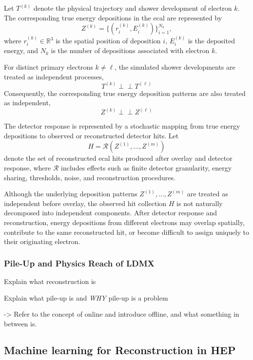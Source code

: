 Let \(T^{(k)}\) denote the physical trajectory and shower development of electron \(k\). 
The corresponding true energy depositions in the \gls{ecal} are represented by
\[
Z^{(k)} = \{(r^{(k)}_i, E^{(k)}_i)\}_{i=1}^{N_k},
\]
where \(r^{(k)}_i \in \mathbb{R}^3\) is the spatial position of deposition \(i\), 
\(E^{(k)}_i\) is the deposited energy, and \(N_k\) is the number of depositions associated with electron \(k\).

For distinct primary electrons \(k \neq \ell\), the simulated shower developments are treated as independent processes,
\[
T^{(k)} \perp\!\!\!\perp T^{(\ell)}
\]
Consequently, the corresponding true energy deposition patterns are also treated as independent,
\[
Z^{(k)} \perp\!\!\!\perp Z^{(\ell)}
\]

The detector response is represented by a stochastic mapping from true energy depositions to observed or reconstructed detector hits. 
Let
\[
H = \mathcal{R}\!\left(Z^{(1)},\ldots,Z^{(m)}\right)
\]
denote the set of reconstructed \gls{ecal} hits produced after overlay and detector response, where \(\mathcal{R}\) includes effects such as finite detector granularity, energy sharing, thresholds, noise, and reconstruction procedures.

Although the underlying deposition patterns \(Z^{(1)},\ldots,Z^{(m)}\) are treated as independent before overlay, the observed hit collection \(H\) is not naturally decomposed into independent components. After detector response and reconstruction, energy depositions from different electrons may overlap spatially, contribute to the same reconstructed hit, or become difficult to assign uniquely to their originating electron.



\subsubsection{Pile-Up and Physics Reach of LDMX}

Explain what reconstruction is

Explain what pile-up is and \textit{WHY} pile-up is a problem

-> Refer to the concept of online and introduce offline, and what something in between is. 

\subsection{Machine learning for Reconstruction in HEP}
\label{sec:ml_event_reconstruction_hep}


